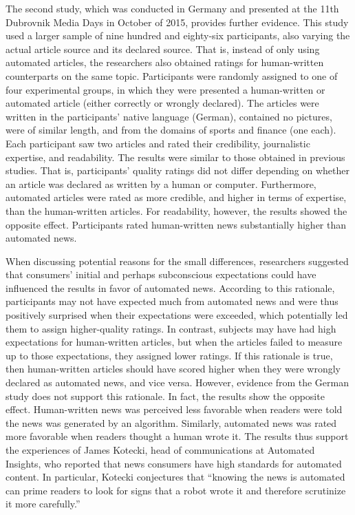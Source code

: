 \documentclass[notoc, symmetric, nobib, nols]{towcenter-book}
\begin{document}
\begin{framed}
The second study, which was conducted in Germany and presented at the 11th Dubrovnik Media Days in October of 2015, provides further evidence.\cite{graefe15} This study used a larger sample of nine hundred and eighty-six participants, also varying the actual article source and its declared source. That is, instead of only using automated articles, the researchers also obtained ratings for human-written counterparts on the same topic. Participants were randomly assigned to one of four experimental groups, in which they were presented a human-written or automated article (either correctly or wrongly declared). The articles were written in the participants’ native language (German), contained no pictures, were of similar length, and from the domains of sports and finance (one each). Each participant saw two articles and rated their credibility, journalistic expertise, and readability. The results were similar to those obtained in previous studies. That is, participants’ quality ratings did not differ depending on whether an article was declared as written by a human or computer. Furthermore, automated articles were rated as more credible, and higher in terms of expertise, than the human-written articles. For readability, however, the results showed the opposite effect. Participants rated human-written news substantially higher than automated news.
\end{framed}

When discussing potential reasons for the small differences, researchers suggested that consumers’ initial and perhaps subconscious expectations could have influenced the results in favor of automated news.\cite{kaa14} According to this rationale, participants may not have expected much from automated news and were thus positively surprised when their expectations were exceeded, which potentially led them to assign higher-quality ratings. In contrast, subjects may have had high expectations for human-written articles, but when the articles failed to measure up to those expectations, they assigned lower ratings. If this rationale is true, then human-written articles should have scored higher when they were wrongly declared as automated news, and vice versa. However, evidence from the German study does not support this rationale.\cite{graefe15} In fact, the results show the opposite effect. Human-written news was perceived less favorable when readers were told the news was generated by an algorithm. Similarly, automated news was rated more favorable when readers thought a human wrote it. The results thus support the experiences of James Kotecki, head of communications at Automated Insights, who reported that news consumers have high standards for automated content. In particular, Kotecki conjectures that ``knowing the news is automated can prime readers to look for signs that a robot wrote it and therefore scrutinize it more carefully.''
\end{document}
